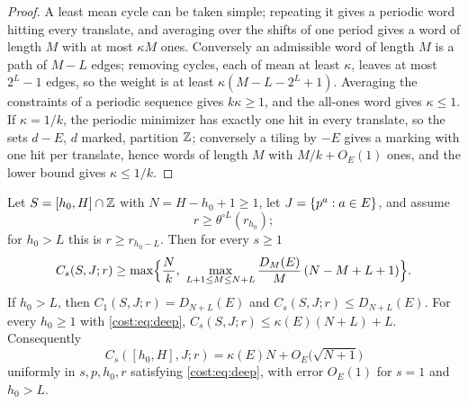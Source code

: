 \begin{proof}
A least mean cycle can be taken simple; repeating it gives a periodic word hitting every
translate, and averaging over the shifts of one period gives a word of length $M$ with at
most $\kappa M$ ones. Conversely an admissible word of length $M$ is a path of $M-L$ edges;
removing cycles, each of mean at least $\kappa$, leaves at most $2^L-1$ edges, so the weight
is at least $\kappa(M-L-2^L+1)$. Averaging the constraints of a periodic sequence gives
$k\kappa\ge1$, and the all-ones word gives $\kappa\le1$. If $\kappa=1/k$, the periodic
minimizer has exactly one hit in every translate, so the sets $d-E$, $d$ marked, partition
$\mathbb{Z}$; conversely a tiling by $-E$ gives a marking with one hit per translate, hence words of
length $M$ with $M/k+O_E(1)$ ones, and the lower bound gives $\kappa\le1/k$.
\end{proof}

\begin{theorem}\label{cost:thm:chain}
Let $S=[h_0,H]\cap\mathbb{Z}$ with $N=H-h_0+1\ge1$, let $J=\{p^a:a\in E\}$, and assume
\begin{equation}\label{cost:eq:deep}
 r\ge\theta^{\circ L}(r_{h_0}) ;
\end{equation}
for $h_0>L$ this is $r\ge r_{h_0-L}$. Then for every $s\ge1$
\begin{equation}\label{cost:eq:chain}
 C_s(S,J;r)\ge\max\Bigl\{\frac Nk,\ \max_{L+1\le M\le N+L}\frac{D_M(E)}M\,(N-M+L+1)\Bigr\}.
\end{equation}
If $h_0>L$, then $C_1(S,J;r)=D_{N+L}(E)$ and $C_s(S,J;r)\le D_{N+L}(E)$. For every
$h_0\ge1$ with \eqref{cost:eq:deep}, $C_s(S,J;r)\le\kappa(E)(N+L)+L$. Consequently
\[
 C_s([h_0,H],J;r)=\kappa(E)N+O_E\bigl(\sqrt{N+1}\bigr)
\]
uniformly in $s,p,h_0,r$ satisfying \eqref{cost:eq:deep}, with error $O_E(1)$ for $s=1$ and
$h_0>L$.
\end{theorem}

